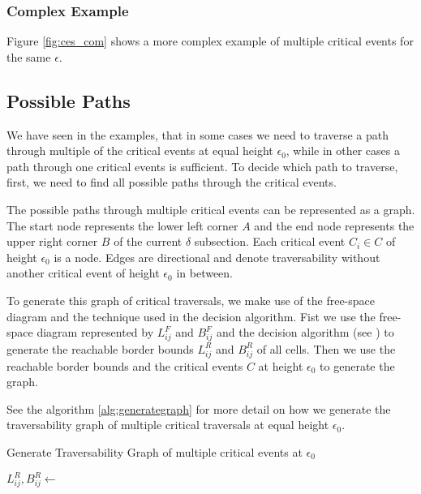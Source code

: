 \subsubsection{Complex Example}

Figure \ref{fig:ces_com} shows a more complex example of multiple critical events for the same $\epsilon$. 






\subsection{Possible Paths}

We have seen in the examples, that in some cases we need to traverse a path through multiple of the critical events at equal height $\epsilon_0$, while in other cases a path through one critical events is sufficient. To decide which path to traverse, first, we need to find all possible paths through the critical events.

The possible paths through multiple critical events can be represented as a graph. The start node represents the lower left corner $A$ and the end node represents the upper right corner $B$ of the current $\delta$ subsection. Each critical event $C_i \in C$ of height $\epsilon_0$ is a node. Edges are directional and denote traversability without another critical event of height $\epsilon_0$ in between.

To generate this graph of critical traversals, we make use of the free-space diagram and the technique used in the decision algorithm. Fist we use the free-space diagram represented by $L_{ij}^F$ and $B_{ij}^F$ and the decision algorithm (see \citet{altgodau}) to generate the reachable border bounds $L_{ij}^R$ and $B_{ij}^R$ of all cells. Then we use the reachable border bounds and the critical events $C$ at height $\epsilon_0$ to generate the graph.

See the algorithm \ref{alg:generategraph} for more detail on how we generate the traversability graph of multiple critical traversals at equal height $\epsilon_0$.


\begin{algorithm}[H]
\caption{Generate Traversability Graph of multiple critical events at $\epsilon_0$}\label{alg:generategraph}
\begin{algorithmic}[1]


\State $L_{ij}^R, B_{ij}^R \gets$ 


	

\EndFunction


\end{algorithmic}
\end{algorithm}



